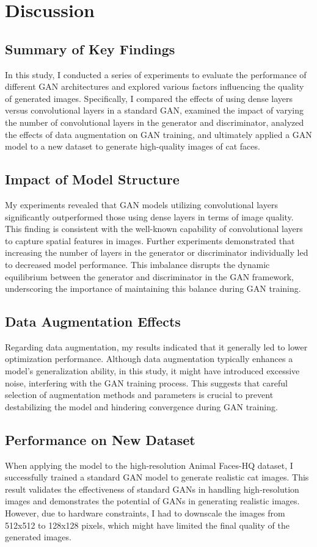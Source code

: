 \chapter{Discussion}
\label{Discussion}

\section{Summary of Key Findings}
In this study, I conducted a series of experiments to evaluate the performance of different 
GAN architectures and explored various factors influencing the quality of generated images. 
Specifically, I compared the effects of using dense layers versus convolutional layers in a standard GAN, 
examined the impact of varying the number of convolutional layers in the generator and discriminator, 
analyzed the effects of data augmentation on GAN training, and ultimately applied a GAN model to a 
new dataset to generate high-quality images of cat faces.

\section{Impact of Model Structure}
My experiments revealed that GAN models utilizing convolutional layers significantly outperformed
 those using dense layers in terms of image quality. This finding is consistent with the well-known 
 capability of convolutional layers to capture spatial features in images. Further experiments 
 demonstrated that increasing the number of layers in the generator or discriminator individually 
 led to decreased model performance. This imbalance disrupts the dynamic equilibrium between the 
 generator and discriminator in the GAN framework, underscoring the importance of maintaining this balance during GAN training.

\section{Data Augmentation Effects}
Regarding data augmentation, my results indicated that it generally led to lower optimization performance. 
Although data augmentation typically enhances a model's generalization ability, in this study, it might have 
introduced excessive noise, interfering with the GAN training process. This suggests that careful selection of 
augmentation methods and parameters is crucial to prevent destabilizing the model and hindering convergence during GAN training.

\section{Performance on New Dataset}
When applying the model to the high-resolution Animal Faces-HQ dataset, I successfully trained a standard GAN model 
to generate realistic cat images. This result validates the effectiveness of standard GANs in handling high-resolution 
images and demonstrates the potential of GANs in generating realistic images. However, due to hardware constraints, 
I had to downscale the images from 512x512 to 128x128 pixels, which might have limited the final quality of the generated images.

